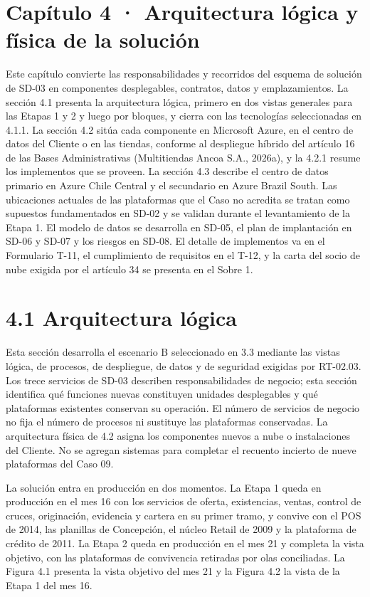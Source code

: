 \documentclass[11pt]{article}
\begin{document}
\tableofcontents
\clearpage

\section{Capítulo 4 · Arquitectura lógica y física de la solución}

Este capítulo convierte las responsabilidades y recorridos del esquema de solución de SD-03 en componentes desplegables, contratos, datos y emplazamientos. La sección 4.1 presenta la arquitectura lógica, primero en dos vistas generales para las Etapas 1 y 2 y luego por bloques, y cierra con las tecnologías seleccionadas en 4.1.1. La sección 4.2 sitúa cada componente en Microsoft Azure, en el centro de datos del Cliente o en las tiendas, conforme al despliegue híbrido del artículo 16 de las Bases Administrativas (Multitiendas Ancoa S.A., 2026a), y la 4.2.1 resume los implementos que se proveen. La sección 4.3 describe el centro de datos primario en Azure Chile Central y el secundario en Azure Brazil South. Las ubicaciones actuales de las plataformas que el Caso no acredita se tratan como supuestos fundamentados en SD-02 y se validan durante el levantamiento de la Etapa 1. El modelo de datos se desarrolla en SD-05, el plan de implantación en SD-06 y SD-07 y los riesgos en SD-08. El detalle de implementos va en el Formulario T-11, el cumplimiento de requisitos en el T-12, y la carta del socio de nube exigida por el artículo 34 se presenta en el Sobre 1.

\section{4.1 Arquitectura lógica}

Esta sección desarrolla el escenario B seleccionado en 3.3 mediante las vistas lógica, de procesos, de despliegue, de datos y de seguridad exigidas por RT-02.03. Los trece servicios de SD-03 describen responsabilidades de negocio; esta sección identifica qué funciones nuevas constituyen unidades desplegables y qué plataformas existentes conservan su operación. El número de servicios de negocio no fija el número de procesos ni sustituye las plataformas conservadas. La arquitectura física de 4.2 asigna los componentes nuevos a nube o instalaciones del Cliente. No se agregan sistemas para completar el recuento incierto de nueve plataformas del Caso 09.

La solución entra en producción en dos momentos. La Etapa 1 queda en producción en el mes 16 con los servicios de oferta, existencias, ventas, control de cruces, originación, evidencia y cartera en su primer tramo, y convive con el POS de 2014, las planillas de Concepción, el núcleo Retail de 2009 y la plataforma de crédito de 2011. La Etapa 2 queda en producción en el mes 21 y completa la vista objetivo, con las plataformas de convivencia retiradas por olas conciliadas. La Figura 4.1 presenta la vista objetivo del mes 21 y la Figura 4.2 la vista de la Etapa 1 del mes 16.
\end{document}
